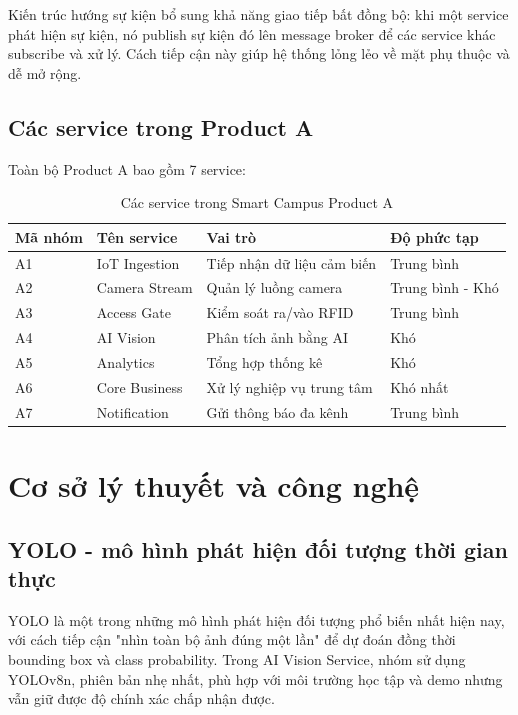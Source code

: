 Kiến trúc hướng sự kiện bổ sung khả năng giao tiếp bất đồng bộ: khi một service phát hiện sự kiện, nó publish sự kiện đó lên message broker để các service khác subscribe và xử lý. Cách tiếp cận này giúp hệ thống lỏng lẻo về mặt phụ thuộc và dễ mở rộng.

\subsection{Các service trong Product A}

Toàn bộ Product A bao gồm 7 service:

\begin{table}[H]
\centering
\caption{Các service trong Smart Campus Product A}
\label{tab:services-product-a}
\ReportTableFont
\begin{tabular}{|>{\raggedright\arraybackslash}p{2.0cm}|>{\raggedright\arraybackslash}p{3.1cm}|>{\raggedright\arraybackslash}p{4.4cm}|>{\raggedright\arraybackslash}p{3.0cm}|}
\hline
\textbf{Mã nhóm} & \textbf{Tên service} & \textbf{Vai trò} & \textbf{Độ phức tạp} \\
\hline
A1 & IoT Ingestion & Tiếp nhận dữ liệu cảm biến & Trung bình \\
\hline
A2 & Camera Stream & Quản lý luồng camera & Trung bình - Khó \\
\hline
A3 & Access Gate & Kiểm soát ra/vào RFID & Trung bình \\
\hline
A4 & AI Vision & Phân tích ảnh bằng AI & Khó \\
\hline
A5 & Analytics & Tổng hợp thống kê & Khó \\
\hline
A6 & Core Business & Xử lý nghiệp vụ trung tâm & Khó nhất \\
\hline
A7 & Notification & Gửi thông báo đa kênh & Trung bình \\
\hline
\end{tabular}
\normalsize
{}
\end{table}

\section{Cơ sở lý thuyết và công nghệ}

\subsection{YOLO - mô hình phát hiện đối tượng thời gian thực}

YOLO là một trong những mô hình phát hiện đối tượng phổ biến nhất hiện nay, với cách tiếp cận "nhìn toàn bộ ảnh đúng một lần" để dự đoán đồng thời bounding box và class probability. Trong AI Vision Service, nhóm sử dụng YOLOv8n, phiên bản nhẹ nhất, phù hợp với môi trường học tập và demo nhưng vẫn giữ được độ chính xác chấp nhận được.

